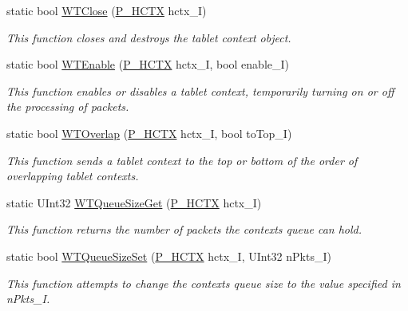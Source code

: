 \begin{DoxyCompactItemize}
static bool \mbox{\hyperlink{class_wintab_d_n_1_1_c_wintab_funcs_a8d62228bbf3a89d2e215814ab8577c81}{W\+T\+Close}} (\mbox{\hyperlink{namespace_wintab_d_n_a9ae61204cd14d7ef23008991d1fb6dff}{P\+\_\+\+H\+C\+TX}} hctx\+\_\+I)
\begin{DoxyCompactList}\small\item\em This function closes and destroys the tablet context object. \end{DoxyCompactList}\item 
static bool \mbox{\hyperlink{class_wintab_d_n_1_1_c_wintab_funcs_ae1540a3e439fdac7395f0672bf24ad18}{W\+T\+Enable}} (\mbox{\hyperlink{namespace_wintab_d_n_a9ae61204cd14d7ef23008991d1fb6dff}{P\+\_\+\+H\+C\+TX}} hctx\+\_\+I, bool enable\+\_\+I)
\begin{DoxyCompactList}\small\item\em This function enables or disables a tablet context, temporarily turning on or off the processing of packets. \end{DoxyCompactList}\item 
static bool \mbox{\hyperlink{class_wintab_d_n_1_1_c_wintab_funcs_ad9f39d79eb6b0933a0fc092e8f198e8a}{W\+T\+Overlap}} (\mbox{\hyperlink{namespace_wintab_d_n_a9ae61204cd14d7ef23008991d1fb6dff}{P\+\_\+\+H\+C\+TX}} hctx\+\_\+I, bool to\+Top\+\_\+I)
\begin{DoxyCompactList}\small\item\em This function sends a tablet context to the top or bottom of the order of overlapping tablet contexts. \end{DoxyCompactList}\item 
static U\+Int32 \mbox{\hyperlink{class_wintab_d_n_1_1_c_wintab_funcs_ac299f5c183ddd3fc2e49eaa51dce6ed7}{W\+T\+Queue\+Size\+Get}} (\mbox{\hyperlink{namespace_wintab_d_n_a9ae61204cd14d7ef23008991d1fb6dff}{P\+\_\+\+H\+C\+TX}} hctx\+\_\+I)
\begin{DoxyCompactList}\small\item\em This function returns the number of packets the context\textquotesingle{}s queue can hold. \end{DoxyCompactList}\item 
static bool \mbox{\hyperlink{class_wintab_d_n_1_1_c_wintab_funcs_a66e6a811ecd2830ae6f2784b4beedd10}{W\+T\+Queue\+Size\+Set}} (\mbox{\hyperlink{namespace_wintab_d_n_a9ae61204cd14d7ef23008991d1fb6dff}{P\+\_\+\+H\+C\+TX}} hctx\+\_\+I, U\+Int32 n\+Pkts\+\_\+I)
\begin{DoxyCompactList}\small\item\em This function attempts to change the context\textquotesingle{}s queue size to the value specified in n\+Pkts\+\_\+I. \end{DoxyCompactList}\item 

\end{DoxyCompactItemize}
